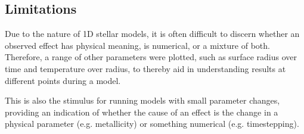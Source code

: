 \subsection{Limitations}

Due to the nature of 1D stellar models, it is often difficult to discern whether an observed effect has physical meaning, is numerical, or a mixture of both. Therefore, a range of other parameters were plotted, such as surface radius over time and temperature over radius, to thereby aid in understanding results at different points during a model. 

This is also the stimulus for running models with small parameter changes, providing an indication of whether the cause of an effect is the change in a physical parameter (e.g. metallicity) or something numerical (e.g. timestepping).




